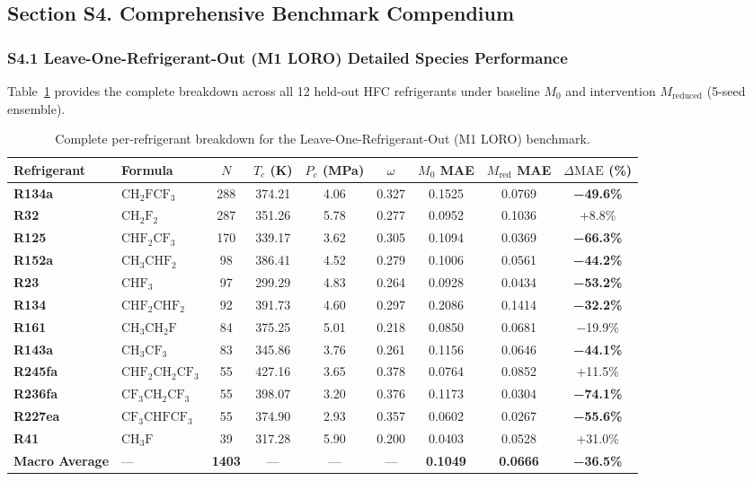 \subsection*{Section S4. Comprehensive Benchmark Compendium}

\subsubsection*{S4.1 Leave-One-Refrigerant-Out (M1 LORO) Detailed Species Performance}
Table~\ref{tab:si_m1_loro_details} provides the complete breakdown across all 12 held-out HFC refrigerants under baseline $M_0$ and intervention $M_{\mathrm{reduced}}$ (5-seed ensemble).

\begin{table}[htbp]
\centering
\small
\caption{Complete per-refrigerant breakdown for the Leave-One-Refrigerant-Out (M1 LORO) benchmark.}
\label{tab:si_m1_loro_details}
\begin{tabular}{llccccccc}
\toprule
\textbf{Refrigerant} & \textbf{Formula} & \textbf{$N$} & \textbf{$T_c$ (K)} & \textbf{$P_c$ (MPa)} & \textbf{$\omega$} & \textbf{$M_0$ MAE} & \textbf{$M_{\mathrm{red}}$ MAE} & \textbf{$\Delta\text{MAE}$ (\%)} \\
\midrule
\textbf{R134a} & $\text{CH}_2\text{FCF}_3$ & 288 & 374.21 & 4.06 & 0.327 & 0.1525 & 0.0769 & \textbf{−49.6\%} \\
\textbf{R32} & $\text{CH}_2\text{F}_2$ & 287 & 351.26 & 5.78 & 0.277 & 0.0952 & 0.1036 & +8.8\% \\
\textbf{R125} & $\text{CHF}_2\text{CF}_3$ & 170 & 339.17 & 3.62 & 0.305 & 0.1094 & 0.0369 & \textbf{−66.3\%} \\
\textbf{R152a} & $\text{CH}_3\text{CHF}_2$ & 98 & 386.41 & 4.52 & 0.279 & 0.1006 & 0.0561 & \textbf{−44.2\%} \\
\textbf{R23} & $\text{CHF}_3$ & 97 & 299.29 & 4.83 & 0.264 & 0.0928 & 0.0434 & \textbf{−53.2\%} \\
\textbf{R134} & $\text{CHF}_2\text{CHF}_2$ & 92 & 391.73 & 4.60 & 0.297 & 0.2086 & 0.1414 & \textbf{−32.2\%} \\
\textbf{R161} & $\text{CH}_3\text{CH}_2\text{F}$ & 84 & 375.25 & 5.01 & 0.218 & 0.0850 & 0.0681 & −19.9\% \\
\textbf{R143a} & $\text{CH}_3\text{CF}_3$ & 83 & 345.86 & 3.76 & 0.261 & 0.1156 & 0.0646 & \textbf{−44.1\%} \\
\textbf{R245fa} & $\text{CHF}_2\text{CH}_2\text{CF}_3$ & 55 & 427.16 & 3.65 & 0.378 & 0.0764 & 0.0852 & +11.5\% \\
\textbf{R236fa} & $\text{CF}_3\text{CH}_2\text{CF}_3$ & 55 & 398.07 & 3.20 & 0.376 & 0.1173 & 0.0304 & \textbf{−74.1\%} \\
\textbf{R227ea} & $\text{CF}_3\text{CHFCF}_3$ & 55 & 374.90 & 2.93 & 0.357 & 0.0602 & 0.0267 & \textbf{−55.6\%} \\
\textbf{R41} & $\text{CH}_3\text{F}$ & 39 & 317.28 & 5.90 & 0.200 & 0.0403 & 0.0528 & +31.0\% \\
\midrule
\textbf{Macro Average} & — & \textbf{1403} & — & — & — & \textbf{0.1049} & \textbf{0.0666} & \textbf{−36.5\%} \\
\bottomrule
\end{tabular}
\end{table}
